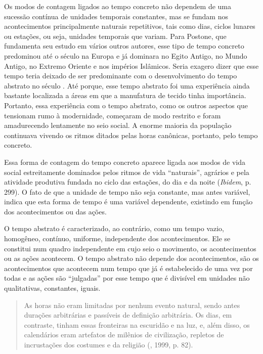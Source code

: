 Os modos de contagem ligados ao tempo concreto não dependem de uma
sucessão contínua de unidades temporais constantes, mas se fundam nos
acontecimentos principalmente naturais repetitivos, tais como dias,
ciclos lunares ou estações, ou seja, unidades temporais que variam. Para
Postone, que fundamenta seu estudo em vários outros autores, esse tipo
de tempo concreto predominou até o século  na Europa e já dominara no
Egito Antigo, no Mundo Antigo, no Extremo Oriente e nos impérios
Islâmicos. Seria exagero dizer que esse tempo teria deixado de ser
predominante com o desenvolvimento do tempo abstrato no século . Até
porque, esse tempo abstrato foi uma experiência ainda bastante
localizada a áreas em que a manufatura de tecido tinha importância.
Portanto, essa experiência com o tempo abstrato, como os outros aspectos
que tensionam rumo à modernidade, começaram de modo restrito e foram
amadurecendo lentamente no seio social. A enorme maioria da população
continuava vivendo os ritmos ditados pelas horas canônicas, portanto,
pelo tempo concreto.

Essa forma de contagem do tempo concreto aparece ligada aos modos de
vida social estreitamente dominados pelos ritmos de vida ``naturais'',
agrários e pela atividade produtiva fundada no ciclo das estações, do
dia e da noite (\emph{Ibidem}, p. 299). O fato de que a unidade de
tempo não seja constante, mas antes variável, indica que esta forma de
tempo é uma variável dependente, existindo em função dos acontecimentos
ou das ações.

O tempo abstrato é caracterizado, ao contrário, como um tempo vazio,
homogêneo, contínuo, uniforme, independente dos acontecimentos. Ele se
constitui num quadro independente em cujo seio o movimento, os
acontecimentos ou as ações acontecem. O tempo abstrato não depende dos
acontecimentos, são os acontecimentos que acontecem num tempo que já é
estabelecido de uma vez por todas e as ações são ``julgadas'' por esse
tempo que é divisível em unidades não qualitativas, constantes, iguais.

\begin{quote}
As horas não eram limitadas por nenhum evento natural, sendo antes
durações arbitrárias e passíveis de definição arbitrária. Os dias, em
contraste, tinham essas fronteiras na escuridão e na luz, e, além disso,
os calendários eram artefatos de milênios de civilização, repletos de
incrustações dos costumes e da religião (, 1999, p. 82).
\end{quote}

